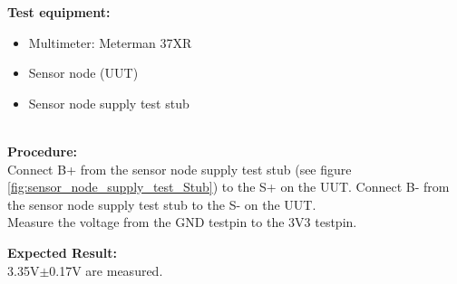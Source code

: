 \textbf{Test equipment:}
\begin{itemize}
\item Multimeter: Meterman 37XR
\item Sensor node (UUT)
\item Sensor node supply test stub
\end{itemize}
\ \\
\textbf{Procedure:}\\
Connect B+ from the sensor node supply test stub (see figure \ref{fig:sensor_node_supply_test_Stub}) to the S+ on the UUT. Connect B- from the sensor node supply test stub to the S- on the UUT.\\
Measure the voltage from the GND testpin to the 3V3 testpin.

\begin{figure}[H]
	\centering

\end{figure}

\textbf{Expected Result:}\\
3.35V$\pm$0.17V are measured.\\

